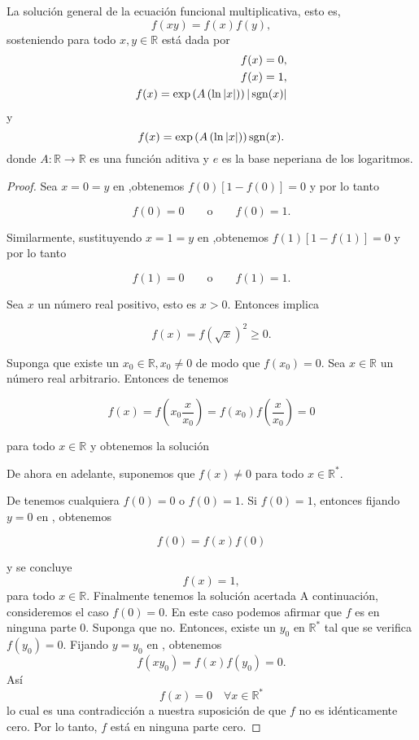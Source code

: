\begin{theorem}
La solución general de la ecuación funcional multiplicativa, esto es,
\[f(xy)=f(x)f(y),\]
sosteniendo para todo $x,y\in\mathbb{R}$ está dada por
\begin{align*}
f(x) = 0,&\\
f(x) = 1,&\\
f(x) = \exp\left(A\left(\ln|x|\right)\right)|\operatorname{sgn}(x)|
\end{align*}
y
\[f(x)=\exp\left(A\left(\ln|x|\right)\right)\operatorname{sgn}(x).\]
donde $A\colon\mathbb{R}\rightarrow\mathbb{R}$ es una función aditiva y $e$ es la base neperiana de los logaritmos.
\begin{proof}
Sea $x=0=y$ en %
,obtenemos $f(0)\left[1-f(0)\right]=0$ y por lo tanto

\[f(0)=0\qquad\text{o}\qquad f(0)=1.\]

Similarmente, sustituyendo $x=1=y$ en %
,obtenemos  $f(1)\left[1-f(1)\right]=0$ y por lo tanto

\[f(1)=0\qquad\text{o}\qquad f(1)=1.\]

Sea $x$ un número real positivo, esto es $x>0$. Entonces %
implica

\[f(x)=f{\left(\sqrt{x}\right)}^{2}\geq0.\]

Suponga que existe un $x_0\in\mathbb{R}, x_0\neq0$ de modo que $f(x_0)=0$. Sea $x\in\mathbb{R}$ un número real arbitrario. Entonces de %
tenemos

\[f(x)=f\left(x_0\frac{x}{x_0}\right)=f(x_0)f\left(\frac{x}{x_0}\right)=0\]

para todo $x\in\mathbb{R}$ y obtenemos la solución %

De ahora en adelante, suponemos que $f(x)\neq0$ para todo $x\in\mathbb{R}^{\ast}$.

De %
tenemos cualquiera $f(0)=0$ o $f(0)=1$. Si $f(0)=1$, entonces fijando $y=0$ en %
, obtenemos

\[f(0)=f(x)f(0)\]

y se concluye
\[f(x)=1,\]
para todo $x\in\mathbb{R}$. Finalmente tenemos la solución acertada %
A continuación, consideremos el caso $f(0)=0$. En este caso podemos afirmar que $f$ es en ninguna parte 0. Suponga que no. Entonces, existe un $y_0$ en $\mathbb{R}^{\ast}$ tal que se verifica $f(y_0)=0$. Fijando $y=y_0$ en %
, obtenemos
\[f(xy_0)=f(x)f(y_0)=0.\]
Así
\[f(x)=0\quad\forall x\in\mathbb{R}^{\ast}\]
lo cual es una contradicción a nuestra suposición de que $f$ no es idénticamente cero. Por lo tanto, $f$ está en ninguna parte cero.


\end{proof}
\end{theorem}
